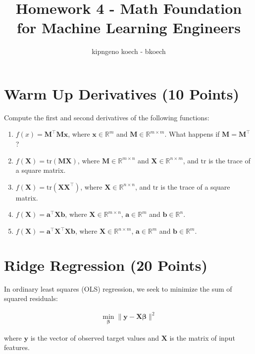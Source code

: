 \documentclass{article}
\begin{document}
\author{kipngeno koech - bkoech}
\title{Homework 4 - Math Foundation for Machine Learning Engineers}   
\maketitle

\medskip



\section{Warm Up Derivatives (10 Points)}
Compute the first and second derivatives of the following functions:
\begin{enumerate}
    \item $f(x) = \mathbf{M}^\top \mathbf{M} \mathbf{x}$, where $\mathbf{x} \in \mathbb{R}^m$ and $\mathbf{M} \in \mathbb{R}^{m \times m}$. What happens if $\mathbf{M} = \mathbf{M}^\top$?
    \item $f(\mathbf{X}) = \text{tr}(\mathbf{M}\mathbf{X})$, where $\mathbf{M} \in \mathbb{R}^{m \times n}$ and $\mathbf{X} \in \mathbb{R}^{n \times m}$, and $\text{tr}$ is the trace of a square matrix.
    \item $f(\mathbf{X}) = \text{tr}(\mathbf{X} \mathbf{X}^\top)$, where $\mathbf{X} \in \mathbb{R}^{n \times n}$, and $\text{tr}$ is the trace of a square matrix.
    \item $f(\mathbf{X}) = \mathbf{a}^\top \mathbf{X} \mathbf{b}$, where $\mathbf{X} \in \mathbb{R}^{m \times n}$, $\mathbf{a} \in \mathbb{R}^m$ and $\mathbf{b} \in \mathbb{R}^n$.
    \item $f(\mathbf{X}) = \mathbf{a}^\top \mathbf{X}^\top \mathbf{X} \mathbf{b}$, where $\mathbf{X} \in \mathbb{R}^{n \times m}$, $\mathbf{a} \in \mathbb{R}^m$ and $\mathbf{b} \in \mathbb{R}^m$.
\end{enumerate}

\section{Ridge Regression (20 Points)}
In ordinary least squares (OLS) regression, we seek to minimize the sum of squared residuals:

\begin{align}
\min_{\boldsymbol{\beta}} \|\mathbf{y} - \mathbf{X} \boldsymbol{\beta} \|^2
\end{align}

where $\mathbf{y}$ is the vector of observed target values and $\mathbf{X}$ is the matrix of input features.
\end{document}
